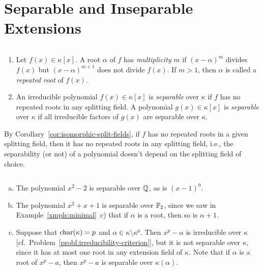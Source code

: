 \section{Separable and Inseparable Extensions}

\begin{defns}${}$
    \begin{enumerate}[-]
        \item Let $f(x) \in \kappa[x]$. A root $\alpha$ of $f$ has \textsl{multiplicity} $m$ if $(x - \alpha)^m$ divides $f(x)$ but $(x - \alpha)^{m+1}$ does not divide $f(x)$. If $m > 1$, then $\alpha$ is called a \textsl{repeated root} of $f(x)$.
    
        \item An irreducible polynomial $f(x) \in \kappa[x]$ is \textsl{separable} over $\kappa$ if $f$ has no repeated roots in any splitting field. A polynomial $g(x) \in \kappa[x]$ is \textsl{separable} over $\kappa$ if all irreducible factors of $g(x)$ are separable over $\kappa$.
    \end{enumerate}
\end{defns}

\begin{rem}
    By Corollary~\ref{cor:isomorphic-split-fields}, if $f$ has no repeated roots in a given splitting field, then it has no repeated roots in any splitting field, i.e., the separability (or not) of a polynomial doesn't depend on the splitting field of choice.
\end{rem}

\begin{xmpls}${}$
    \begin{enumerate}[a), font=\upshape]
        \item The polynomial $x^2 - 2$ is separable over $\mathbb{Q}$, as is $(x - 1)^9$.
        
        \item The polynomial $x^2 + x + 1$ is separable over $\mathbb F_2$, since we saw in Example~\ref{xmpls:minimal}~c) that if $\alpha$ is a root, then so is $\alpha + 1$.
        
        \item Suppose that $\operatorname{char}(\kappa) = p$ and $\alpha \in \kappa\setminus\kappa^p$. Then $x^p - \alpha$ is irreducible over $\kappa$ [cf.~Problem~\ref{probl:irreducibility-criterion}], but it is not separable over $\kappa$, since it has at most one root in any extension field of $\kappa$. Note that if $\alpha$ is a root of $x^p-a$, then $x^p-a$ is separable over $\kappa(\alpha)$.
    \end{enumerate}
\end{xmpls}

